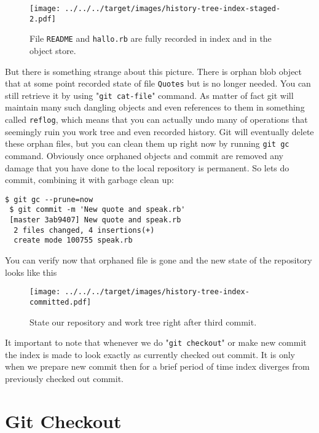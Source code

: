 \documentclass{article}
\theoremstyle{definition}
\begin{document}
        \begin{figure}[h]
            \centering\texttt{[image: ../../../target/images/history-tree-index-staged-2.pdf]}
            \caption{File \texttt{README} and \texttt{hallo.rb} are fully recorded in index and in the object store.\label{fig:history-tree-index-staged-2}}
        \end{figure}

        \noindent But there is something strange about this picture. There is orphan blob object that at some point
        recorded state of file \texttt{Quotes} but is no longer needed. You can still retrieve it by using
        "\texttt{git cat-file}" command. As matter of fact git will maintain many such dangling objects and even
        references to them in something called \texttt{reflog}, which means that you can actually undo many of
        operations that seemingly ruin you work tree and even recorded history. Git will eventually delete these orphan
        files, but you can clean them up right now by running \texttt{git gc} command. Obviously once orphaned objects
        and commit are removed any damage that you have done to the local repository is permanent. So lets do commit,
        combining it with garbage clean up:

    \begin{Verbatim}[frame=single]
 $ git gc --prune=now
 $ git commit -m 'New quote and speak.rb'
 [master 3ab9407] New quote and speak.rb
  2 files changed, 4 insertions(+)
  create mode 100755 speak.rb
        \end{Verbatim}
        You can verify now that orphaned file is gone and the new state of the repository looks like this

        \begin{figure}[h]
        \texttt{[image: ../../../target/images/history-tree-index-committed.pdf]}
        \caption{State our repository and work tree right after third commit.\label{fig:history-tree-index-committed}}
        \end{figure}

        It important to note that whenever we do "\texttt{git checkout}" or make new commit the index is made to look
        exactly as currently checked out commit. It is only when we prepare new commit then for a brief period of time
        index diverges from previously checked out commit.

        \section{Git Checkout}
\end{document}
